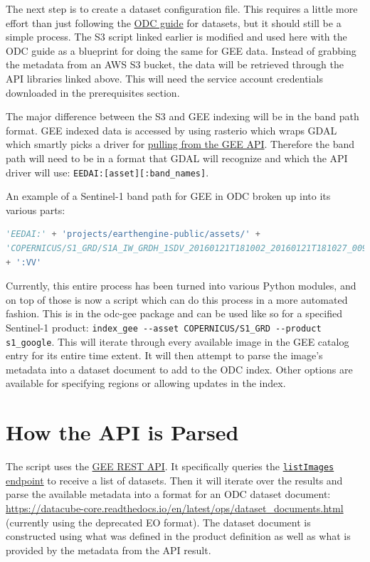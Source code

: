 \documentclass{article}
\begin{document}
The next step is to create a dataset configuration file. This requires
a little more effort than just following the
\href{https://datacube-core.readthedocs.io/en/latest/ops/dataset_documents.html}{ODC
guide} for datasets, but it should still be a simple process. The S3 script
linked earlier is modified and used here with the ODC guide as a blueprint for
doing the same for GEE data. Instead of grabbing the metadata from an AWS S3
bucket, the data will be retrieved through the API libraries linked above. This
will need the service account credentials downloaded in the prerequisites
section.

The major difference between the S3 and GEE indexing will be in the band path
format. GEE indexed data is accessed by using rasterio
which wraps GDAL which smartly picks a driver for
\href{https://gdal.org/drivers/raster/eedai.html}{pulling from the GEE API}.
Therefore the band path will need to be in a format that GDAL will recognize
and which the API driver will use: \lstinline{EEDAI:[asset][:band_names]}.

An example of a Sentinel-1 band path for GEE in ODC broken up into its various
parts:
\begin{lstlisting}[language=python]
'EEDAI:' + 'projects/earthengine-public/assets/' +
'COPERNICUS/S1_GRD/S1A_IW_GRDH_1SDV_20160121T181002_20160121T181027_009596_00DF74_ABC5'
+ ':VV'
\end{lstlisting}

Currently, this entire process has been turned into various Python modules, and
on top of those is now a script which can do this process in a more automated
fashion. This is in the odc-gee package and can be used like so for a specified
Sentinel-1 product:
\lstinline{index_gee --asset COPERNICUS/S1_GRD --product s1_google}. This will
iterate through every available image in the GEE catalog entry for its entire
time extent. It will then attempt to parse the image's metadata into a dataset
document to add to the ODC index. Other options are available for specifying
regions or allowing updates in the index.

\section{How the API is Parsed}
The script uses the
\href{https://developers.google.com/earth-engine/reference}{GEE REST API}. It
specifically queries the
\href{https://developers.google.com/earth-engine/reference/rest/v1alpha/projects.assets/listImages}{\lstinline{listImages}
endpoint} to receive a list of datasets. Then it will iterate over the results
and parse the available metadata into a format for an ODC dataset document:
\url{https://datacube-core.readthedocs.io/en/latest/ops/dataset_documents.html}
(currently using the deprecated EO format). The dataset document is constructed
using what was defined in the product definition as well as what is provided by
the metadata from the API result.
\end{document}
